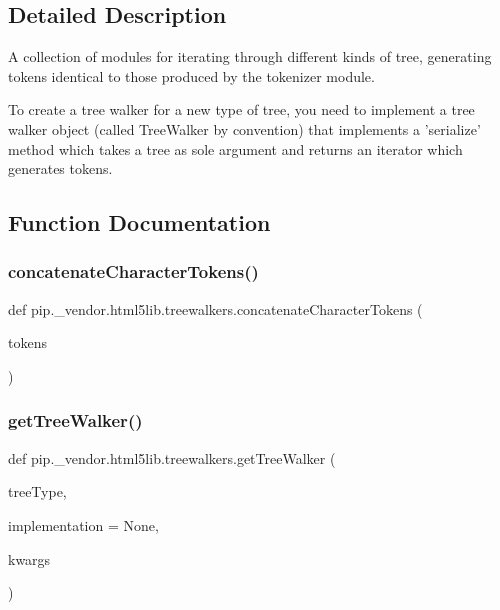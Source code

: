 \subsection{Detailed Description}
\begin{DoxyVerb}A collection of modules for iterating through different kinds of
tree, generating tokens identical to those produced by the tokenizer
module.

To create a tree walker for a new type of tree, you need to
implement a tree walker object (called TreeWalker by convention) that
implements a 'serialize' method which takes a tree as sole argument and
returns an iterator which generates tokens.
\end{DoxyVerb}
 

\subsection{Function Documentation}
\mbox{\label{namespacepip_1_1__vendor_1_1html5lib_1_1treewalkers_aab9e4c5d1e598b631dc17cadf71c546e}} 
\subsubsection{\texorpdfstring{concatenate\+Character\+Tokens()}{concatenateCharacterTokens()}}
{\footnotesize\ttfamily def pip.\+\_\+vendor.\+html5lib.\+treewalkers.\+concatenate\+Character\+Tokens (\begin{DoxyParamCaption}\item[{}]{tokens }\end{DoxyParamCaption})}

\mbox{\label{namespacepip_1_1__vendor_1_1html5lib_1_1treewalkers_afd1e779f070509c261273bdf7b3028f4}} 
\subsubsection{\texorpdfstring{get\+Tree\+Walker()}{getTreeWalker()}}
{\footnotesize\ttfamily def pip.\+\_\+vendor.\+html5lib.\+treewalkers.\+get\+Tree\+Walker (\begin{DoxyParamCaption}\item[{}]{tree\+Type,  }\item[{}]{implementation = {\ttfamily None},  }\item[{}]{kwargs }\end{DoxyParamCaption})}

